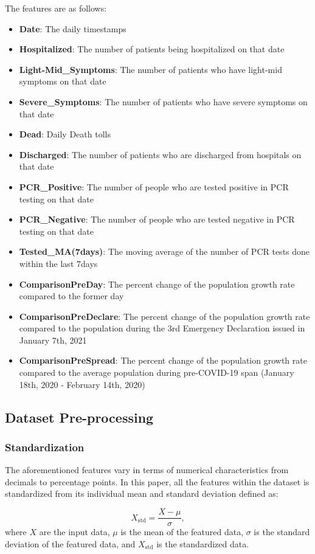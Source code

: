 \noindent The features are as follows:
\begin{itemize}
\item \textbf{Date}: The daily timestamps
\item \textbf{Hospitalized}: The number of patients being hospitalized on that date
\item \textbf{Light-Mid\_Symptoms}: The number of patients who have light-mid symptoms on that date
\item \textbf{Severe\_Symptoms}:  The number of patients who have severe symptoms on that date 
\item \textbf{Dead}: Daily Death tolls
\item \textbf{Discharged}: The number of patients who are discharged from hospitals on that date 
\item \textbf{PCR\_Positive}: The number of people who are tested positive in PCR testing on that date
\item \textbf{PCR\_Negative}: The number of people who are tested negative in PCR testing on that date
\item \textbf{Tested\_MA(7days)}: The moving average of the number of PCR tests done within the last 7days
\item \textbf{ComparisonPreDay}: The percent change of the population growth rate compared to the former day
\item \textbf{ComparisonPreDeclare}: The percent change of the population growth rate compared to the population during the 3rd Emergency Declaration issued in January 7th, 2021
\item \textbf{ComparisonPreSpread}: The percent change of the population growth rate compared to the average population during pre-COVID-19 span (January 18th, 2020 - February 14th, 2020)
\end{itemize}

\subsection{Dataset Pre-processing}
\subsubsection{Standardization}
The aforementioned features vary in terms of numerical characteristics from decimals to percentage points. In this paper, all the features within the dataset is standardized from its individual mean and standard deviation defined as:

\begin{equation}\label{eq:standardized}
    X_{\mathrm{std}} =\frac{X - \mu}{\sigma} ,
\end{equation}
where $X$ are the input data, $\mu$ is the mean of the featured data, $\sigma$ is the standard deviation of the featured data, and $X_\mathrm{{std}}$ is the standardized data. 

